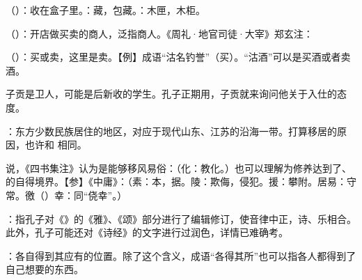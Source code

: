 {
\begin{lyitemize}
\item {}（）：收在盒子里。：藏，包藏。：木匣，木柜。
\item {}（）：开店做买卖的商人，泛指商人。《周礼·地官司徒·大宰》郑玄注：
\item {}（）：买或卖，这里是卖。【例】成语“沽名钓誉”（买）。“沽酒”可以是买酒或者卖酒。
\end{lyitemize}
子贡是卫人，可能是后新收的学生。孔子正期用，子贡就来询问他关于入仕的态度。
}
{}


{
\item {}：东方少数民族居住的地区，对应于现代山东、江苏的沿海一带。打算移居的原因，也许和  相同。
\item {}说，《四书集注》认为是能够移风易俗：（化：教化。）也可以理解为修养达到了、的自得境界。【参】《中庸》：（素：本，据。陵：欺侮，侵犯。援：攀附。居易：守常。徼（）幸：同“侥幸”。）
}
{}


{
\item {}：指孔子对《》的《雅》、《颂》部分进行了编辑修订，使音律中正，诗、乐相合。此外，孔子可能还对《诗经》的文字进行过润色，详情已难确考。
\item {}：各自得到其应有的位置。除了这个含义，成语“各得其所”也可以指各人都得到了自己想要的东西。
}
{}


